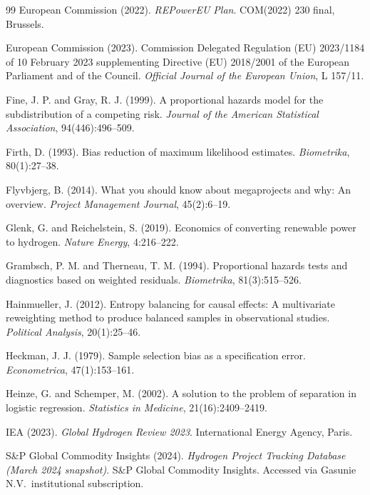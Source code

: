 \documentclass[review,authoryear,11pt]{elsarticle}
\begin{document}
\begin{thebibliography}{99}
European Commission (2022). \textit{REPowerEU Plan}. COM(2022) 230 final, Brussels.

European Commission (2023). Commission Delegated Regulation (EU) 2023/1184 of 10 February 2023 supplementing Directive (EU) 2018/2001 of the European Parliament and of the Council. \textit{Official Journal of the European Union}, L 157/11.

Fine, J. P. and Gray, R. J. (1999). A proportional hazards model for the subdistribution of a competing risk. \textit{Journal of the American Statistical Association}, 94(446):496--509.

Firth, D. (1993). Bias reduction of maximum likelihood estimates. \textit{Biometrika}, 80(1):27--38.

Flyvbjerg, B. (2014). What you should know about megaprojects and why: An overview. \textit{Project Management Journal}, 45(2):6--19.

Glenk, G. and Reichelstein, S. (2019). Economics of converting renewable power to hydrogen. \textit{Nature Energy}, 4:216--222.

Grambsch, P. M. and Therneau, T. M. (1994). Proportional hazards tests and diagnostics based on weighted residuals. \textit{Biometrika}, 81(3):515--526.

Hainmueller, J. (2012). Entropy balancing for causal effects: A multivariate reweighting method to produce balanced samples in observational studies. \textit{Political Analysis}, 20(1):25--46.

Heckman, J. J. (1979). Sample selection bias as a specification error. \textit{Econometrica}, 47(1):153--161.

Heinze, G. and Schemper, M. (2002). A solution to the problem of separation in logistic regression. \textit{Statistics in Medicine}, 21(16):2409--2419.

IEA (2023). \textit{Global Hydrogen Review 2023}. International Energy Agency, Paris.

S\&P Global Commodity Insights (2024). \textit{Hydrogen Project Tracking Database (March 2024 snapshot)}. S\&P Global Commodity Insights. Accessed via Gasunie N.V.\ institutional subscription.


\end{thebibliography}
\end{document}
